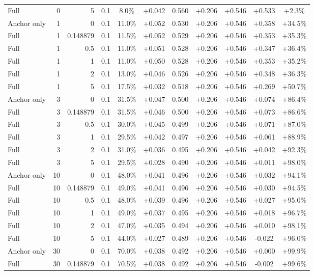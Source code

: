 \begin{table}[htbp]
\begin{tabular}{lrrrccccccc}
Full & 0 & 5 & 0.1 & 8.0\% & +0.042 & 0.560 & +0.206 & +0.546 & +0.533 & +2.3\% \\
Anchor only & 1 & 0 & 0.1 & 11.0\% & +0.052 & 0.530 & +0.206 & +0.546 & +0.358 & +34.5\% \\
Full & 1 & 0.148879 & 0.1 & 11.5\% & +0.052 & 0.529 & +0.206 & +0.546 & +0.353 & +35.3\% \\
Full & 1 & 0.5 & 0.1 & 11.0\% & +0.051 & 0.528 & +0.206 & +0.546 & +0.347 & +36.4\% \\
Full & 1 & 1 & 0.1 & 11.0\% & +0.050 & 0.528 & +0.206 & +0.546 & +0.353 & +35.2\% \\
Full & 1 & 2 & 0.1 & 13.0\% & +0.046 & 0.526 & +0.206 & +0.546 & +0.348 & +36.3\% \\
Full & 1 & 5 & 0.1 & 17.5\% & +0.032 & 0.518 & +0.206 & +0.546 & +0.269 & +50.7\% \\
Anchor only & 3 & 0 & 0.1 & 31.5\% & +0.047 & 0.500 & +0.206 & +0.546 & +0.074 & +86.4\% \\
Full & 3 & 0.148879 & 0.1 & 31.5\% & +0.046 & 0.500 & +0.206 & +0.546 & +0.073 & +86.6\% \\
Full & 3 & 0.5 & 0.1 & 30.0\% & +0.045 & 0.499 & +0.206 & +0.546 & +0.071 & +87.0\% \\
Full & 3 & 1 & 0.1 & 29.5\% & +0.042 & 0.497 & +0.206 & +0.546 & +0.061 & +88.9\% \\
Full & 3 & 2 & 0.1 & 31.0\% & +0.036 & 0.495 & +0.206 & +0.546 & +0.042 & +92.3\% \\
Full & 3 & 5 & 0.1 & 29.5\% & +0.028 & 0.490 & +0.206 & +0.546 & +0.011 & +98.0\% \\
Anchor only & 10 & 0 & 0.1 & 48.0\% & +0.041 & 0.496 & +0.206 & +0.546 & +0.032 & +94.1\% \\
Full & 10 & 0.148879 & 0.1 & 49.0\% & +0.041 & 0.496 & +0.206 & +0.546 & +0.030 & +94.5\% \\
Full & 10 & 0.5 & 0.1 & 48.0\% & +0.039 & 0.496 & +0.206 & +0.546 & +0.027 & +95.0\% \\
Full & 10 & 1 & 0.1 & 49.0\% & +0.037 & 0.495 & +0.206 & +0.546 & +0.018 & +96.7\% \\
Full & 10 & 2 & 0.1 & 47.0\% & +0.035 & 0.494 & +0.206 & +0.546 & +0.010 & +98.1\% \\
Full & 10 & 5 & 0.1 & 44.0\% & +0.027 & 0.489 & +0.206 & +0.546 & -0.022 & +96.0\% \\
Anchor only & 30 & 0 & 0.1 & 70.0\% & +0.038 & 0.492 & +0.206 & +0.546 & +0.000 & +99.9\% \\
Full & 30 & 0.148879 & 0.1 & 70.5\% & +0.038 & 0.492 & +0.206 & +0.546 & -0.002 & +99.6\% \\

\end{tabular}
\end{table}
